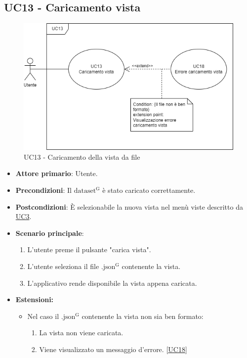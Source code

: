 \subsection{UC13 - Caricamento vista}
\label{sec:UC13}
\begin{figure}[h!]
    \centering
    \includegraphics[scale=0.60]{../../assets/caricamento_vista.png}
    \caption{UC13 - Caricamento della vista da file}
\end{figure}
\begin{itemize}
    \item \textbf{Attore primario}: Utente.
    \item \textbf{Precondizioni}: Il ${\mathrm{dataset^{G}}}$ è stato caricato correttamente.
    \item \textbf{Postcondizioni}: È selezionabile la nuova vista nel menù viste descritto da \hyperref[sec:UC3]{UC3}.
    \item \textbf{Scenario principale}:
          \begin{enumerate}
              \item L'utente preme il pulsante "carica vista".
              \item L'utente seleziona il file ${\mathrm{.json^{G}}}$ contenente la vista.
              \item L'applicativo rende disponibile la vista appena caricata.
          \end{enumerate}
    \item \textbf{Estensioni:}
    \begin{itemize}
        \item Nel caso il ${\mathrm{.json^{G}}}$ contenente la vista non sia ben formato: 
        \begin{enumerate}
            \item La vista non viene caricata.
            \item Viene visualizzato un messaggio d'errore. [\hyperref[sec:UC18 - Errore caricamento vista]{UC18}]
        \end{enumerate}
    \end{itemize}
\end{itemize}

